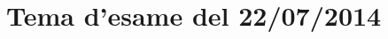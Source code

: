 \documentclass[main.tex]{subfiles}
\begin{document}
\section{Tema d'esame del 22/07/2014}

%

%
\end{document}
